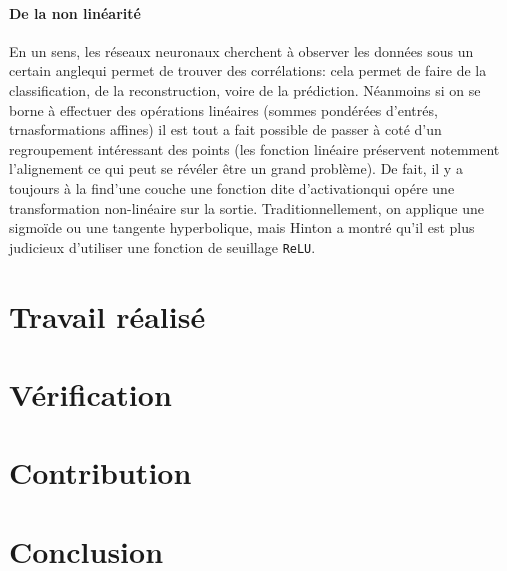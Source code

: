 \documentclass[a4paper,11pt, twocolumn]{article}
\begin{document}
\paragraph{De la non linéarité}

En un sens, les réseaux neuronaux cherchent à observer les données \og sous un
certain angle\fg qui permet de trouver des corrélations: cela permet de faire de
la classification, de la reconstruction, voire de la prédiction. Néanmoins si on
se borne à effectuer des opérations linéaires (sommes pondérées
d'entrés, trnasformations affines) il est tout a fait possible de passer à coté
d'un regroupement intéressant des points (les fonction linéaire préservent
notemment l'alignement ce qui peut se révéler être un grand problème). De fait,
il y a toujours \og à la fin\fg d'une couche une fonction dite \og
d'activation\fg qui opére une transformation non-linéaire sur la sortie.
Traditionnellement, on applique une sigmoïde ou une tangente hyperbolique, mais
Hinton a montré qu'il est plus judicieux d'utiliser une fonction de seuillage \texttt{ReLU}.

\section{Travail réalisé}



\section{Vérification}

\section{Contribution}

\section*{Conclusion}

\printbibliography
\end{document}
